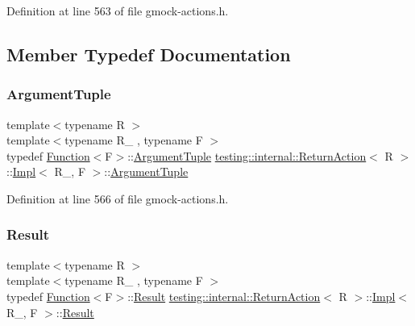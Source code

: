 Definition at line 563 of file gmock-\/actions.\+h.



\subsection{Member Typedef Documentation}
\mbox{\label{classtesting_1_1internal_1_1ReturnAction_1_1Impl_ae6311cbcb9aefd71304a7e40b24be62b}} 
\subsubsection{\texorpdfstring{Argument\+Tuple}{ArgumentTuple}}
{\footnotesize\ttfamily template$<$typename R $>$ \\
template$<$typename R\+\_\+ , typename F $>$ \\
typedef \hyperlink{structtesting_1_1internal_1_1Function}{Function}$<$F$>$\+::\hyperlink{classtesting_1_1ActionInterface_af72720d864da4d606629e83edc003511}{Argument\+Tuple} \hyperlink{classtesting_1_1internal_1_1ReturnAction}{testing\+::internal\+::\+Return\+Action}$<$ R $>$\+::\hyperlink{classtesting_1_1internal_1_1ReturnAction_1_1Impl}{Impl}$<$ R\+\_\+, F $>$\+::\hyperlink{classtesting_1_1ActionInterface_af72720d864da4d606629e83edc003511}{Argument\+Tuple}}



Definition at line 566 of file gmock-\/actions.\+h.

\mbox{\label{classtesting_1_1internal_1_1ReturnAction_1_1Impl_a681fdf18258f86ea31efe0c55217e571}} 
\subsubsection{\texorpdfstring{Result}{Result}}
{\footnotesize\ttfamily template$<$typename R $>$ \\
template$<$typename R\+\_\+ , typename F $>$ \\
typedef \hyperlink{structtesting_1_1internal_1_1Function}{Function}$<$F$>$\+::\hyperlink{classtesting_1_1internal_1_1ReturnAction_1_1Impl_a681fdf18258f86ea31efe0c55217e571}{Result} \hyperlink{classtesting_1_1internal_1_1ReturnAction}{testing\+::internal\+::\+Return\+Action}$<$ R $>$\+::\hyperlink{classtesting_1_1internal_1_1ReturnAction_1_1Impl}{Impl}$<$ R\+\_\+, F $>$\+::\hyperlink{classtesting_1_1internal_1_1ReturnAction_1_1Impl_a681fdf18258f86ea31efe0c55217e571}{Result}}



